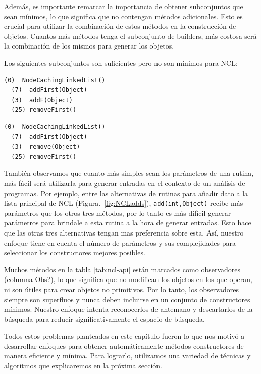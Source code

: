 Además, es importante remarcar la importancia de obtener subconjuntos que sean mínimos, lo que significa que no contengan métodos adicionales. Esto es crucial para utilizar la combinación de estos métodos en la construcción de objetos. Cuantos más métodos tenga el subconjunto de builders, más costosa será la combinación de los mismos para generar los objetos.

Los siguientes subconjuntos son suficientes pero no son mínimos para NCL:
\\

\begin{lstlisting}[numbers=none,label=fig:NCLnoMin, frame=tb , basicstyle=\scriptsize]
  (0)  NodeCachingLinkedList()
  (7)  addFirst(Object)
  (3)  addF(Object)
  (25) removeFirst()
\end{lstlisting}

\begin{lstlisting}[numbers=none,label=fig:NCLnoMin1, caption= Conjuntos de metodos builders suficientes pero no mínimos, captionpos=b, frame=tb , basicstyle=\scriptsize]
  (0)  NodeCachingLinkedList()
  (7)  addFirst(Object)
  (3)  remove(Object)
  (25) removeFirst()
\end{lstlisting}

También observamos que cuanto más simples sean los parámetros de una rutina, más fácil será utilizarla para generar entradas en el contexto de un análisis de programas. Por ejemplo, entre las alternativas de rutinas para añadir dato a la lista principal de NCL (Figura.~\ref{fig:NCLadds}), \texttt{add(int,Object)} recibe más parámetros que los otros tres métodos, por lo tanto es más difícil generar parámetros para brindale a esta rutina a la hora de generar entradas. Esto hace que las otras tres alternativas tengan mas preferencia sobre esta. Así, nuestro enfoque tiene en cuenta el número de parámetros y sus complejidades para seleccionar los constructores mejores posibles.

Muchos métodos en la tabla \ref{tab:ncl-api} están marcados como observadores (columna Obs?), lo que significa que no modifican los objetos en los que operan, ni son útiles para crear objetos no primitivos. Por lo tanto, los observadores siempre son superfluos y nunca deben incluirse en un conjunto de constructores mínimos. Nuestro enfoque intenta reconocerlos de antemano y descartarlos de la búsqueda para reducir significativamente el espacio de búsqueda.

Todos estos problemas planteados en este capítulo fueron lo que nos motivó a desarrollar enfoques para obtener automáticamente métodos constructores de manera eficiente y mínima. Para lograrlo, utilizamos una variedad de técnicas y algoritmos que explicaremos en la próxima sección. 


